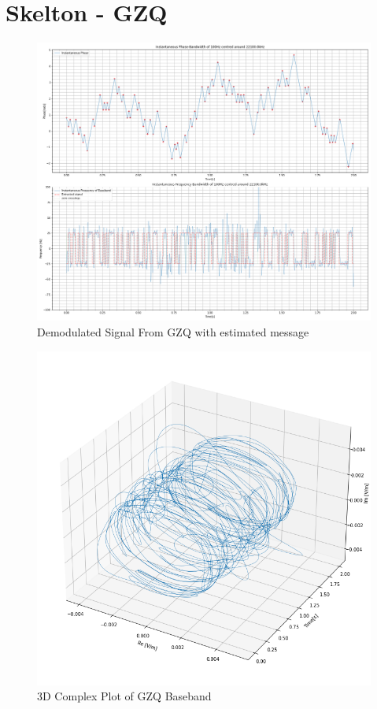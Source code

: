 \section{Skelton - \textbf{GZQ}}

\begin{figure}[H]
    \centering
    \includegraphics[width = \textwidth]{figs/AppA/GZQ.png}
    \caption{Demodulated Signal From GZQ with estimated message}
    \label{fig:my_label}
\end{figure}
\begin{figure}[H]
    \centering
    \includegraphics[width = \textwidth]{figs/AppA/gzq3D.png}
    \caption{3D Complex Plot of GZQ Baseband}
    \label{fig:my_label}
\end{figure}

